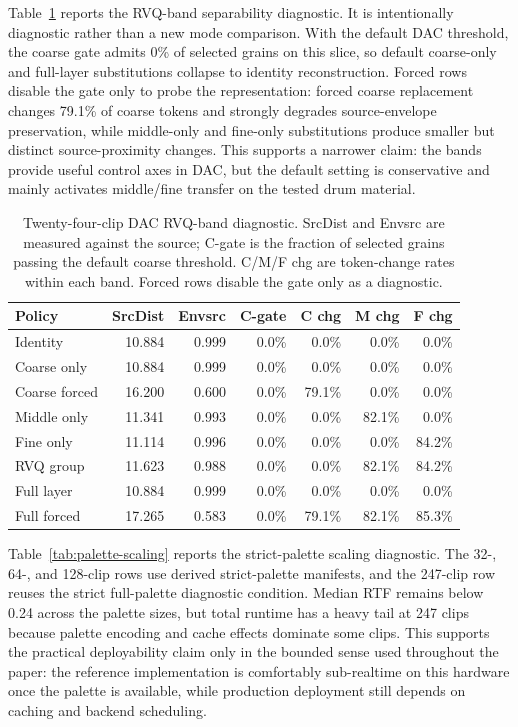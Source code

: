 \documentclass[twoside,a4paper]{article}
\begin{document}
Table~\ref{tab:rvq-band-diagnostic} reports the RVQ-band separability diagnostic. It is intentionally diagnostic rather than a new mode comparison. With the default DAC threshold, the coarse gate admits 0\% of selected grains on this slice, so default coarse-only and full-layer substitutions collapse to identity reconstruction. Forced rows disable the gate only to probe the representation: forced coarse replacement changes 79.1\% of coarse tokens and strongly degrades source-envelope preservation, while middle-only and fine-only substitutions produce smaller but distinct source-proximity changes. This supports a narrower claim: the bands provide useful control axes in DAC, but the default setting is conservative and mainly activates middle/fine transfer on the tested drum material.

\begin{table}[!t]
    \centering
    \scriptsize
    \setlength{\tabcolsep}{2pt}
    \caption{Twenty-four-clip DAC RVQ-band diagnostic. SrcDist and Envsrc are measured against the source; C-gate is the fraction of selected grains passing the default coarse threshold. C/M/F chg are token-change rates within each band. Forced rows disable the gate only as a diagnostic.}
    \label{tab:rvq-band-diagnostic}
    \begin{tabular}{lrrrrrr}
    \toprule
    Policy & SrcDist & Envsrc & C-gate & C chg & M chg & F chg \\
    \midrule
    Identity & 10.884 & 0.999 & 0.0\% & 0.0\% & 0.0\% & 0.0\% \\
    Coarse only & 10.884 & 0.999 & 0.0\% & 0.0\% & 0.0\% & 0.0\% \\
    Coarse forced & 16.200 & 0.600 & 0.0\% & 79.1\% & 0.0\% & 0.0\% \\
    Middle only & 11.341 & 0.993 & 0.0\% & 0.0\% & 82.1\% & 0.0\% \\
    Fine only & 11.114 & 0.996 & 0.0\% & 0.0\% & 0.0\% & 84.2\% \\
    RVQ group & 11.623 & 0.988 & 0.0\% & 0.0\% & 82.1\% & 84.2\% \\
    Full layer & 10.884 & 0.999 & 0.0\% & 0.0\% & 0.0\% & 0.0\% \\
    Full forced & 17.265 & 0.583 & 0.0\% & 79.1\% & 82.1\% & 85.3\% \\
    \bottomrule
    \end{tabular}
\end{table}

Table~\ref{tab:palette-scaling} reports the strict-palette scaling diagnostic. The 32-, 64-, and 128-clip rows use derived strict-palette manifests, and the 247-clip row reuses the strict full-palette diagnostic condition. Median RTF remains below 0.24 across the palette sizes, but total runtime has a heavy tail at 247 clips because palette encoding and cache effects dominate some clips. This supports the practical deployability claim only in the bounded sense used throughout the paper: the reference implementation is comfortably sub-realtime on this hardware once the palette is available, while production deployment still depends on caching and backend scheduling.
\end{document}
